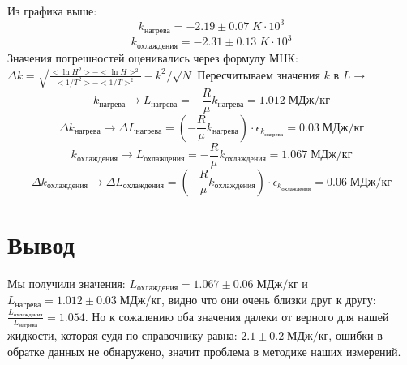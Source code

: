 \documentclass[12 pt, a4paper]{article}%
\begin{document}
\begin{enumerate}
    Из графика выше: $$k_{нагрева} = -2.19\pm0.07 \;K\cdot10^3$$
    $$k_{охлаждения} = -2.31\pm0.13 \;K\cdot10^3$$
    Значения погрешностей оценивались через формулу МНК: $\Delta k = \sqrt{\frac{<\ln{H}^2>-<\ln{H}>^2}{<1/T^2>-<1/T>^2} - k^2}/\sqrt{N}$
    Пересчитываем значения $k$ в $L \rightarrow$ $$k_{нагрева} \rightarrow L_{нагрева} = -\frac{R}{\mu}k_{нагрева} = 1.012 \; МДж/кг$$ $$\Delta k_{нагрева} \rightarrow \Delta L_{нагрева} = (-\frac{R}{\mu}k_{нагрева})\cdot \epsilon_{k_{нагрева}} = 0.03 \; МДж/кг$$ 
    $$k_{охлаждения} \rightarrow L_{охлаждения} = -\frac{R}{\mu}k_{охлаждения} = 1.067 \; МДж/кг$$ $$\Delta k_{охлаждения} \rightarrow \Delta L_{охлаждения} = (-\frac{R}{\mu}k_{охлаждения})\cdot \epsilon_{k_{охлаждения}} = 0.06 \; МДж/кг$$
\end{enumerate}
\section*{Вывод}
Мы получили значения: $L_{охлаждения} = 1.067\pm0.06 \; МДж/кг$ и $L_{нагрева} = 1.012\pm0.03 \; МДж/кг$, видно что они очень близки друг к другу: $\frac{L_{охлаждения}}{L_{нагрева}} = 1.054$. Но к сожалению оба значения далеки от верного для нашей жидкости, которая судя по справочнику равна: $2.1\pm0.2 \; МДж/кг$, ошибки в обратке данных не обнаружено, значит проблема в методике наших измерений.
\end{document}
